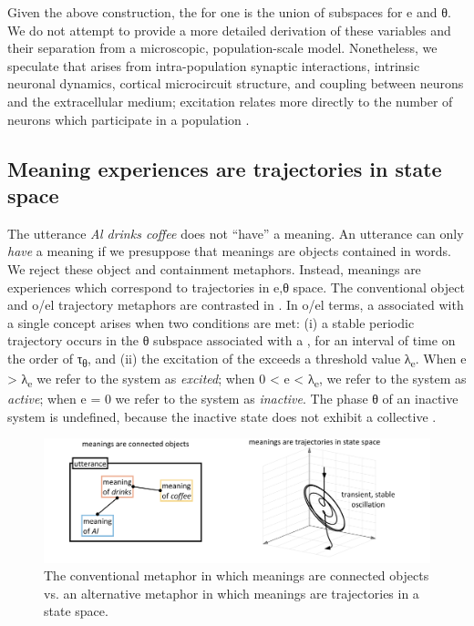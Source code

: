   Given the above construction, the  for one  is the union of subspaces for e and θ. We do not attempt to provide a more detailed derivation of these variables and their separation from a microscopic, population-scale model. Nonetheless, we speculate that  arises from intra-pop\-u\-la\-tion synaptic interactions, intrinsic neuronal dynamics, cortical microcircuit structure, and coupling between neurons and the extracellular medium; excitation relates more directly to the number of neurons which participate in a population .  

\subsection{Meaning experiences are trajectories in state space}

The utterance \textit{Al drinks coffee} does not “have” a meaning. An utterance can only \textit{have} a meaning if we presuppose that meanings are objects contained in words. We reject these object and containment metaphors. Instead, meanings are experiences which correspond to trajectories in  e,θ space. The conventional object and o/el trajectory metaphors are contrasted in {}. In o/el terms, a  associated with a single concept arises when two conditions are met: (i) a stable periodic trajectory occurs in the θ subspace associated with a , for an interval of time on the order of τ\textsubscript{θ}, and (ii) the excitation of the  exceeds a threshold value λ\textsubscript{e}. When e > λ\textsubscript{e} we refer to the system as \textit{excited}; when 0 < e < λ\textsubscript{e}, we refer to the system as \textit{active}; when e = 0 we refer to the system as \textit{inactive}. The phase θ of an inactive system is undefined, because the inactive state does not exhibit a collective . 

  
\begin{figure}
\includegraphics[width=\textwidth]{figures/Tilsen-img13.png}
\caption{The conventional metaphor in which meanings are connected objects vs. an alternative metaphor in which meanings are trajectories in a state space.}
\label{fig:2:6}
\end{figure}
 

